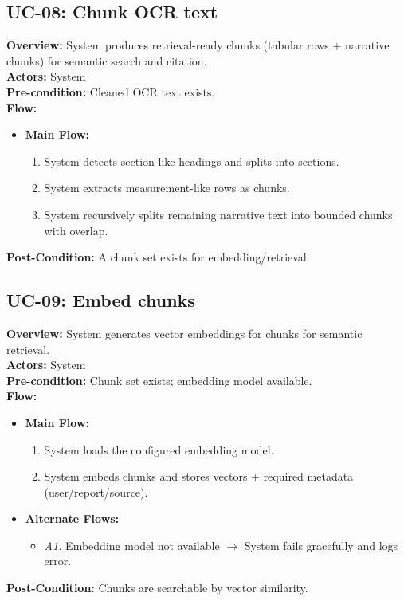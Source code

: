 \documentclass[12pt, a4paper]{article}
\begin{document}
\subsection*{UC-08: Chunk OCR text}
\textbf{Overview:} System produces retrieval-ready chunks (tabular rows + narrative chunks) for semantic search and citation. \\
\textbf{Actors:} System \\
\textbf{Pre-condition:} Cleaned OCR text exists. \\
\textbf{Flow:}
\begin{itemize}[leftmargin=*]
    \item \textbf{Main Flow:}
    \begin{enumerate}
        \item System detects section-like headings and splits into sections.
        \item System extracts measurement-like rows as chunks.
        \item System recursively splits remaining narrative text into bounded chunks with overlap.
    \end{enumerate}
\end{itemize}
\textbf{Post-Condition:} A chunk set exists for embedding/retrieval.

\subsection*{UC-09: Embed chunks}
\textbf{Overview:} System generates vector embeddings for chunks for semantic retrieval. \\
\textbf{Actors:} System \\
\textbf{Pre-condition:} Chunk set exists; embedding model available. \\
\textbf{Flow:}
\begin{itemize}[leftmargin=*]
    \item \textbf{Main Flow:}
    \begin{enumerate}
        \item System loads the configured embedding model.
        \item System embeds chunks and stores vectors + required metadata (user/report/source).
    \end{enumerate}
    \item \textbf{Alternate Flows:}
    \begin{itemize}
        \item \textit{A1.} Embedding model not available $\rightarrow$ System fails gracefully and logs error.
    \end{itemize}
\end{itemize}
\textbf{Post-Condition:} Chunks are searchable by vector similarity.
\end{document}
